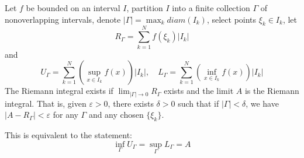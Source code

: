 \documentclass[openany]{book}
\begin{document}
\begin{defn}
    Let $f$ be bounded on an interval $I$, partition $I$ into a finite collection $\Gamma$ of nonoverlapping intervals, denote $|\Gamma|=\max_kdiam(I_k)$, select points $\xi_k\in I_k$, let 
    \begin{equation*}
        R_\Gamma=\sum_{k=1}^Nf(\xi_k)|I_k|
    \end{equation*}
    and 
    \begin{equation*}
        U_\Gamma=\sum_{k=1}^N(\sup_{x\in I_k}f(x))|I_k|, \quad L_\Gamma=\sum_{k=1}^N(\inf_{x\in I_k}f(x))|I_k|
    \end{equation*}
    The Riemann integral exists if $\lim_{|\Gamma|\to 0}R_\Gamma$ exists and the limit $A$ is the Riemann integral. That is, given $\varepsilon>0$, there exists $\delta>0$ such that if $|\Gamma|<\delta$, we have $|A-R_\Gamma|<\varepsilon$ for any $\Gamma$ and any chosen $\{\xi_k\}$.

    This is equivalent to the statement:
    \begin{equation*}
        \inf_\Gamma U_\Gamma=\sup_\Gamma L_\Gamma=A
    \end{equation*}
\end{defn}
\end{document}
